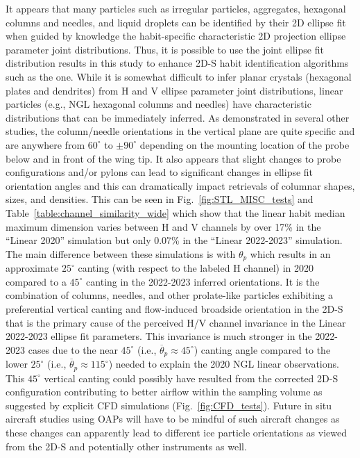 \documentclass[amt, manuscript]{copernicus}
\begin{document}
It appears that many particles such as irregular particles, aggregates, hexagonal columns and needles, and liquid droplets can be identified by their 2D ellipse fit when guided by knowledge the habit-specific characteristic 2D projection ellipse parameter joint distributions. Thus, it is possible to use the joint ellipse fit distribution results in this study to enhance 2D-S habit identification algorithms such as the \citet{Schima2024} one. While it is somewhat difficult to infer planar crystals (hexagonal plates and dendrites) from H and V ellipse parameter joint distributions, linear particles (e.g., NGL hexagonal columns and needles) have characteristic distributions that can be immediately inferred. As demonstrated in several other studies, the column/needle orientations in the vertical plane are quite specific and are anywhere from $60^{\circ}$ to $\pm 90^{\circ}$ depending on the mounting location of the probe below and in front of the wing tip. It also appears that slight changes to probe configurations and/or pylons can lead to significant changes in ellipse fit orientation angles and this can dramatically impact retrievals of columnar shapes, sizes, and densities. This can be seen in Fig.~\ref{fig:STL_MISC_tests} and Table~\ref{table:channel_similarity_wide} which show that the linear habit median maximum dimension varies between H and V channels by over 17\% in the ``Linear 2020'' simulation but only 0.07\% in the ``Linear 2022-2023'' simulation. The main difference between these simulations is with $\theta_{p}$ which results in an approximate $25^{\circ}$ canting (with respect to the labeled H channel) in 2020 compared to a $45^{\circ}$ canting in the 2022-2023 inferred orientations. It is the combination of columns, needles, and other prolate-like particles exhibiting a preferential vertical canting and flow-induced broadside orientation in the 2D-S that is the primary cause of the perceived H/V channel invariance in the Linear 2022-2023 ellipse fit parameters. This invariance is much stronger in the 2022-2023 cases due to the near $45^{\circ}$ (i.e., $\overline{\theta}_{p} \approx 45^{\circ}$) canting angle compared to the lower $25^{\circ}$ (i.e., $\overline{\theta}_{p} \approx 115^{\circ}$) needed to explain the 2020 NGL linear observations. This $45^{\circ}$ vertical canting could possibly have resulted from the corrected 2D-S configuration contributing to better airflow within the sampling volume as suggested by explicit CFD simulations (Fig.~\ref{fig:CFD_tests}). Future in situ aircraft studies using OAPs will have to be mindful of such aircraft changes as these changes can apparently lead to different ice particle orientations as viewed from the 2D-S and potentially other instruments as well.  
\end{document}
